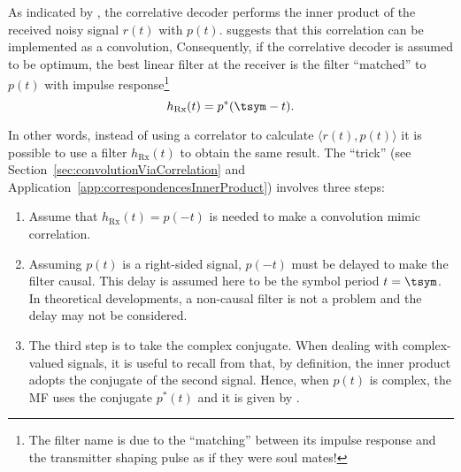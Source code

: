 As indicated by , the correlative decoder performs the inner product
of the received noisy signal $r(t)$ with $p(t)$.  suggests that this correlation
can be implemented as a convolution, 
Consequently, if the correlative decoder is assumed to be optimum, the best linear filter at the receiver is the filter ``matched'' to $p(t)$ with impulse response\footnote{The filter name is due to the ``matching'' between
its impulse response and the transmitter shaping pulse as if they were soul mates!} 
\begin{equation}
h_\textrm{Rx}(t)=p^*(\tsym-t).
\label{eq:matchedFilter}
\end{equation}




In other words, instead of using a correlator to calculate $\langle r(t),p(t) \rangle$ it is possible to use a filter $h_\textrm{Rx}(t)$ to obtain the same result. The ``trick'' (see Section~\ref{sec:convolutionViaCorrelation} and Application~\ref{app:correspondencesInnerProduct}) involves three steps:
\begin{enumerate}
	\item Assume that $h_\textrm{Rx}(t) = p(-t)$ is needed to make a convolution mimic correlation. 
	\item Assuming $p(t)$ is a right-sided signal, $p(-t)$ must be delayed to make the filter causal. This delay is assumed here to be the symbol period $t=\tsym$. In theoretical developments, a non-causal filter is not a problem and the delay may not be considered. 
	\item The third step is to take the complex conjugate.
When dealing with complex-valued signals, it is useful to recall from  that, by definition, the inner product adopts the conjugate of the second signal. Hence, when $p(t)$ is complex, the MF uses the conjugate $p^*(t)$ and it is given by .
\end{enumerate}

